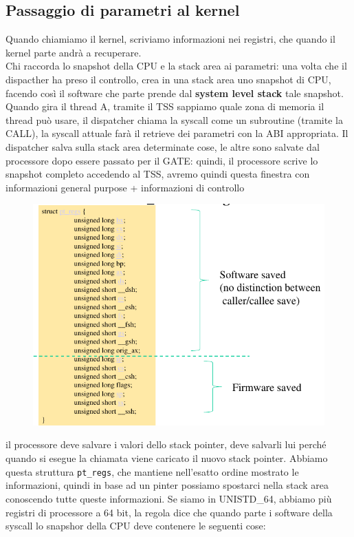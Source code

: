\documentclass[12pt, oneside]{extbook}
\begin{document}
\subsection{Passaggio di parametri al kernel}
Quando chiamiamo il kernel, scriviamo informazioni nei registri, che quando il kernel parte andrà a recuperare.\\Chi raccorda lo snapshot della CPU e la stack area ai parametri: una volta che il dispacther ha preso il controllo, crea in una stack area uno snapshot di CPU, facendo così il software che parte prende dal \textbf{system level stack} tale snapshot. Quando gira il thread A, tramite il TSS sappiamo quale zona di memoria il thread può usare, il dispatcher chiama la syscall come un subroutine (tramite la CALL), la syscall attuale farà il retrieve dei parametri con la ABI appropriata. Il dispatcher salva sulla stack area determinate cose, le altre sono salvate dal processore dopo essere passato per il GATE: quindi, il processore scrive lo snapshot completo accedendo al TSS, avremo quindi questa finestra con informazioni general purpose + informazioni di controllo
\begin{figure}[!h]
	\includegraphics[scale=0.3]{immagini/pt_regs_32.png}
\end{figure}
il processore deve salvare i valori dello stack pointer, deve salvarli lui perché quando si esegue la chiamata viene caricato il nuovo stack pointer. Abbiamo questa struttura \texttt{pt\_regs}, che mantiene nell'esatto ordine mostrato le informazioni, quindi in base ad un pinter possiamo spostarci nella stack area conoscendo tutte queste informazioni. Se siamo in UNISTD\_64, abbiamo più registri di processore a 64 bit, la regola dice che quando parte i software della syscall lo snapshor della CPU deve contenere le seguenti cose:
\end{document}
